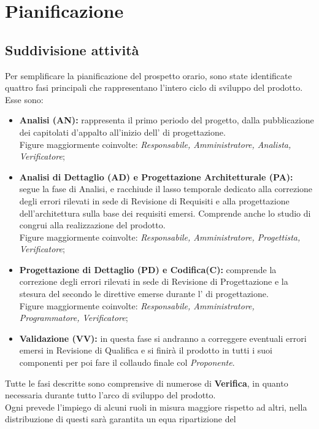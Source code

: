 \documentclass{scalatekids-article}
\begin{document}
\section{Pianificazione}
\subsection{Suddivisione attività}
\label{sub:fasi}
Per semplificare la pianificazione del prospetto orario, sono state identificate
quattro fasi principali che rappresentano l'intero ciclo di sviluppo del prodotto.\\
Esse sono:
\begin{itemize}
\item\textbf{Analisi (AN):} rappresenta il primo periodo del progetto,
dalla
  pubblicazione dei capitolati d'appalto all'inizio dell' di progettazione.\\
  Figure maggiormente coinvolte: \textit{Responsabile, Amministratore, Analista, Verificatore};
\item\textbf{Analisi di Dettaglio (AD) e Progettazione Architetturale (PA):} segue la fase di Analisi, e
  racchiude il lasso temporale dedicato alla correzione degli errori rilevati in
  sede di Revisione di Requisiti e alla progettazione dell'architettura sulla
  base dei requisiti emersi. Comprende anche lo studio di 
  congrui alla realizzazione del prodotto.\\ Figure maggiormente coinvolte:
  \textit{Responsabile, Amministratore, Progettista, Verificatore};
\item\textbf{Progettazione di Dettaglio (PD) e Codifica(C):} comprende la correzione degli errori rilevati in sede di Revisione di Progettazione e la stesura del  secondo le direttive emerse durante l' di progettazione.\\Figure maggiormente coinvolte:
  \textit{Responsabile, Amministratore, Programmatore, Verificatore};
\item\textbf{Validazione (VV):} in questa fase si andranno a correggere eventuali errori emersi in Revisione di Qualifica e si finirà il prodotto in tutti i suoi componenti per poi fare il collaudo finale col \textit{Proponente}.
\end{itemize}
Tutte le fasi descritte sono comprensive di numerose  di \textbf{Verifica}, in quanto necessaria durante tutto l'arco di sviluppo del prodotto.\\Ogni {} prevede l'impiego di alcuni ruoli in misura maggiore rispetto ad altri, nella distribuzione di questi sarà garantita un equa ripartizione del
\end{document}
